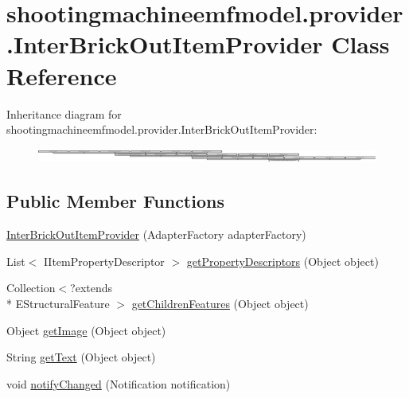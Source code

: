 \hypertarget{classshootingmachineemfmodel_1_1provider_1_1_inter_brick_out_item_provider}{\section{shootingmachineemfmodel.\-provider.\-Inter\-Brick\-Out\-Item\-Provider Class Reference}
\label{classshootingmachineemfmodel_1_1provider_1_1_inter_brick_out_item_provider}
}
Inheritance diagram for shootingmachineemfmodel.\-provider.\-Inter\-Brick\-Out\-Item\-Provider\-:\begin{figure}[H]
\begin{center}
\leavevmode
\includegraphics[height=0.470292cm]{classshootingmachineemfmodel_1_1provider_1_1_inter_brick_out_item_provider}
\end{center}
\end{figure}
\subsection*{Public Member Functions}
\begin{DoxyCompactItemize}
\item 
\hyperlink{classshootingmachineemfmodel_1_1provider_1_1_inter_brick_out_item_provider_aa1943415c4231b2c5e42cb996211697a}{Inter\-Brick\-Out\-Item\-Provider} (Adapter\-Factory adapter\-Factory)
\item 
List$<$ I\-Item\-Property\-Descriptor $>$ \hyperlink{classshootingmachineemfmodel_1_1provider_1_1_inter_brick_out_item_provider_ab9a2d1839faf0199d1f069995e302e19}{get\-Property\-Descriptors} (Object object)
\item 
Collection$<$?extends \\*
E\-Structural\-Feature $>$ \hyperlink{classshootingmachineemfmodel_1_1provider_1_1_inter_brick_out_item_provider_a0293042636eff1a3b5d75e17c42d22f5}{get\-Children\-Features} (Object object)
\item 
Object \hyperlink{classshootingmachineemfmodel_1_1provider_1_1_inter_brick_out_item_provider_adc8b6c5c1a710d41428fae8891fdfe4d}{get\-Image} (Object object)
\item 
String \hyperlink{classshootingmachineemfmodel_1_1provider_1_1_inter_brick_out_item_provider_a050b190fc4443abbc687f68612802013}{get\-Text} (Object object)
\item 
void \hyperlink{classshootingmachineemfmodel_1_1provider_1_1_inter_brick_out_item_provider_a63169e18574ea5c15c392b91ffdb4126}{notify\-Changed} (Notification notification)
\end{DoxyCompactItemize}

